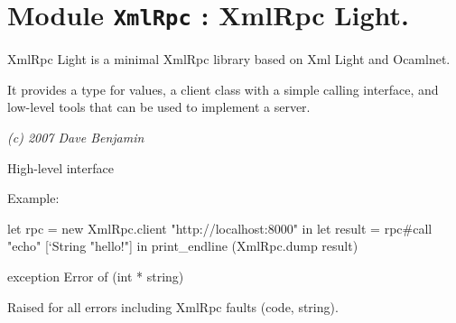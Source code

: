 \documentclass[11pt]{article}
\begin{document}
\tableofcontents
\section{Module {\tt{XmlRpc}} : XmlRpc Light.}
\label{module:XmlRpc}



    XmlRpc Light is a minimal XmlRpc library based on Xml Light and Ocamlnet.


    It provides a type for values, a client class with a simple calling
    interface, and low-level tools that can be used to implement a server.


    {\it (c) 2007 Dave Benjamin}



\ocamldocvspace{0.5cm}



High-level interface



Example: \begin{ocamldoccode}

    let rpc = new XmlRpc.client "http://localhost:8000" in
    let result = rpc#call "echo" [`String "hello!"] in
    print_endline (XmlRpc.dump result) 
\end{ocamldoccode}




\label{exception:XmlRpc.Error}\begin{ocamldoccode}
exception Error of (int * string)
\end{ocamldoccode}
\begin{ocamldocdescription}
Raised for all errors including XmlRpc faults (code, string).


\end{ocamldocdescription}
\end{document}
